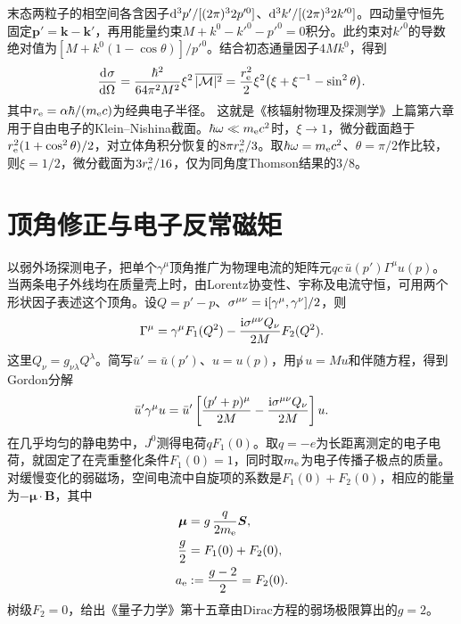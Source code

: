 末态两粒子的相空间各含因子$\mathop{}\!\mathrm{d}^3p'/[(2\pi)^3 2p'^0]$、$\mathop{}\!\mathrm{d}^3k'/[(2\pi)^3 2k'^0]$。四动量守恒先固定$\bm p' = \bm k - \bm k'$，再用能量约束$M + k^0 - k'^0 - p'^0 = 0$积分。此约束对$k'^0$的导数绝对值为$[M + k^0(1 - \cos\theta)]/p'^0$。结合初态通量因子$4Mk^0$，得到
\begin{equation}
    \frac{\mathop{}\!\mathrm{d}^{}\sigma}{\mathrm{d}{\Omega}^{}}
      = \frac{\hbar^2}{64\pi^2 M^2}\xi^2\,\overline{\lvert\mathcal M\rvert^2}
      = \frac{r_{\mathrm{e}}^2}{2}\xi^2\big(\xi + \xi^{-1} - \sin^2\theta\big).
    \label{eq:qed Klein Nishina}
\end{equation}
其中$r_{\mathrm{e}} = \alpha\hbar/(m_{\mathrm{e}} c)$为经典电子半径。
这就是《核辐射物理及探测学》上篇第六章用于自由电子的Klein--Nishina截面。$\hbar\omega \ll m_{\mathrm{e}} c^2$时，$\xi \to 1$，微分截面趋于$r_{\mathrm{e}}^2(1 + \cos^2\theta)/2$，对立体角积分恢复的$8\pi r_{\mathrm{e}}^2/3$。取$\hbar\omega = m_{\mathrm{e}} c^2$、$\theta = \pi/2$作比较，则$\xi = 1/2$，微分截面为$3r_{\mathrm{e}}^2/16$，仅为同角度Thomson结果的$3/8$。

\section{顶角修正与电子反常磁矩}

以弱外场探测电子，把单个$\gamma^\mu$顶角推广为物理电流的矩阵元$q c\,\bar u(p')\Gamma^\mu u(p)$。当两条电子外线均在质量壳上时，由Lorentz协变性、宇称及电流守恒，可用两个形状因子表述这个顶角。设$Q = p' - p$、$\sigma^{\mu\nu} = \mathrm{i}[\gamma^\mu,\gamma^\nu]/2$，则
\begin{equation}
    \label{eq:ed-electromagnetic-form-factors}
    \Gamma^\mu = \gamma^\mu F_1(Q^2)
       - \frac{\mathrm{i}\sigma^{\mu\nu}Q_\nu}{2M}F_2(Q^2).
\end{equation}
这里$Q_\nu = g_{\nu\lambda}Q^\lambda$。简写$\bar u' = \bar u(p')$、$u = u(p)$，用$\not p\,u = Mu$和伴随方程，得到Gordon分解
\begin{equation}
    \label{eq:ed-gordon-identity}
    \bar u'\gamma^\mu u
    = \bar u'\left[\frac{(p' + p)^\mu}{2M}
                - \frac{\mathrm{i}\sigma^{\mu\nu}Q_\nu}{2M}\right]u .
\end{equation}
在几乎均匀的静电势中，$J^0$测得电荷$q F_1(0)$。取$q = -e$为长距离测定的电子电荷，就固定了在壳重整化条件$F_1(0) = 1$，同时取$m_{\mathrm{e}}$为电子传播子极点的质量。对缓慢变化的弱磁场，空间电流中自旋项的系数是$F_1(0) + F_2(0)$，相应的能量为$-\bm\mu \cdot \bm B$，其中
\begin{subequations}
    \label{eq:ed-anomalous-moment}
    \begin{align}
        \bm\mu &= g\,\frac{q}{2m_{\mathrm{e}}}\bm S,\\
        \frac{g}{2} &= F_1(0) + F_2(0),\\
        a_{\mathrm{e}} &:= \frac{g - 2}{2} = F_2(0).
    \end{align}
\end{subequations}
树级$F_2 = 0$，给出《量子力学》第十五章由Dirac方程的弱场极限算出的$g = 2$。

